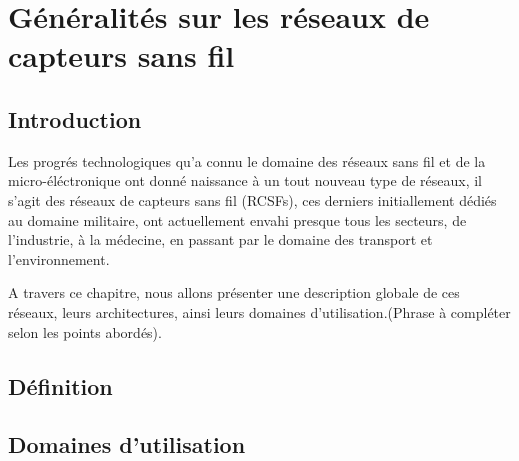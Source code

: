 \chapter{Généralités sur les réseaux de capteurs sans fil}
\section{Introduction}
        Les progrés technologiques qu'a connu le domaine des réseaux sans fil et de la micro-éléctronique ont donné naissance à un tout nouveau type de réseaux, il s'agit des réseaux de capteurs sans fil (RCSFs), ces derniers initiallement dédiés au domaine militaire, ont actuellement envahi presque tous les secteurs,  de l'industrie, à la médecine, en passant par le domaine des transport et l'environnement.
        
        
        A travers ce chapitre, nous allons présenter une description globale de ces réseaux, leurs architectures, ainsi leurs domaines d'utilisation.(Phrase à compléter selon les points abordés).
        

\section{Définition}
\section{Domaines d'utilisation}